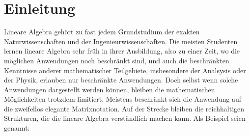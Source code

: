 %
%
%
\chapter*{Einleitung}
Lineare Algebra gehört zu fast jedem Grundstudium der exakten
Naturwissenschaften und der Ingenieurwissenschaften.
Die meisten Studenten lernen lineare Algebra sehr früh in ihrer Ausbildung,
also zu einer Zeit, wo die möglichen Anwendungen noch beschränkt sind,
und auch die beschränkten Kenntnisse anderer mathematischer Teilgebiete,
insbesondere der Analsysis oder der Physik, erlauben nur beschränkte 
Anwendungen.
Doch selbst wenn solche Anwendungen dargestellt werden können, bleiben
die mathematischen Möglichkeiten trotzdem limitiert.
Meistens beschränkt sich die Anwendung auf die zweifellos elegante 
Matrixnotation.
Auf der Strecke bleiben die reichhaltigen Strukturen, die die
lineare Algebra verständlich machen kann.
Als Beispiel seien genannt:
